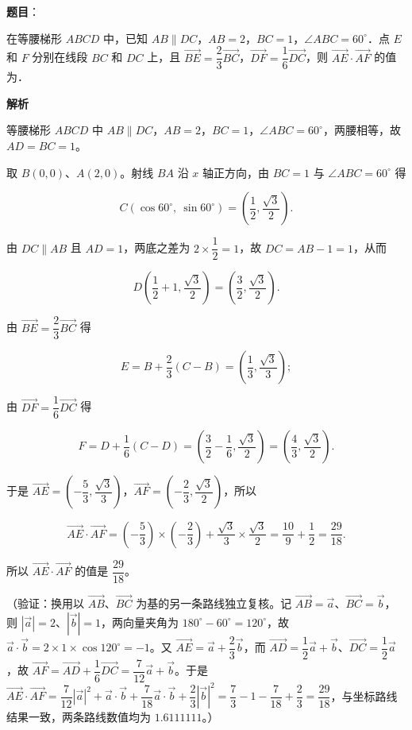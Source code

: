 \begin{answer}

\textbf{题目}：

在等腰梯形 \(ABCD\) 中，已知 \(AB\parallel DC\)，\(AB=2\)，\(BC=1\)，\(\angle ABC=60^{\circ}\)．点 \(E\) 和 \(F\) 分别在线段 \(BC\) 和 \(DC\) 上，且 \(\overrightarrow{BE}=\dfrac{2}{3}\overrightarrow{BC}\)，\(\overrightarrow{DF}=\dfrac{1}{6}\overrightarrow{DC}\)，则 \(\overrightarrow{AE}\cdot\overrightarrow{AF}\) 的值为\gkblank{}．

\textbf{解析}

等腰梯形 \(ABCD\) 中 \(AB\parallel DC\)，\(AB=2\)，\(BC=1\)，\(\angle ABC=60^{\circ}\)，两腰相等，故 \(AD=BC=1\)。

取 \(B(0,0)\)、\(A(2,0)\)。射线 \(BA\) 沿 \(x\) 轴正方向，由 \(BC=1\) 与 \(\angle ABC=60^{\circ}\) 得

\nopagebreak[4]
\[
C\left(\cos60^{\circ},\ \sin60^{\circ}\right)=\left(\dfrac12,\dfrac{\sqrt3}{2}\right).
\]

由 \(DC\parallel AB\) 且 \(AD=1\)，两底之差为 \(2\times\dfrac12=1\)，故 \(DC=AB-1=1\)，从而

\nopagebreak[4]
\[
D\left(\dfrac12+1,\dfrac{\sqrt3}{2}\right)=\left(\dfrac32,\dfrac{\sqrt3}{2}\right).
\]

由 \(\overrightarrow{BE}=\dfrac23\overrightarrow{BC}\) 得

\nopagebreak[4]
\[
E=B+\dfrac23(C-B)=\left(\dfrac13,\dfrac{\sqrt3}{3}\right);
\]

由 \(\overrightarrow{DF}=\dfrac16\overrightarrow{DC}\) 得

\nopagebreak[4]
\[
F=D+\dfrac16(C-D)=\left(\dfrac32-\dfrac16,\dfrac{\sqrt3}{2}\right)=\left(\dfrac43,\dfrac{\sqrt3}{2}\right).
\]

于是 \(\overrightarrow{AE}=\left(-\dfrac53,\dfrac{\sqrt3}{3}\right)\)，\(\overrightarrow{AF}=\left(-\dfrac23,\dfrac{\sqrt3}{2}\right)\)，所以

\nopagebreak[4]
\[
\overrightarrow{AE}\cdot\overrightarrow{AF}=\left(-\dfrac53\right)\times\left(-\dfrac23\right)+\dfrac{\sqrt3}{3}\times\dfrac{\sqrt3}{2}=\dfrac{10}{9}+\dfrac12=\dfrac{29}{18}.
\]

所以 \(\overrightarrow{AE}\cdot\overrightarrow{AF}\) 的值是 \(\dfrac{29}{18}\)。

（验证：换用以 \(\overrightarrow{AB}\)、\(\overrightarrow{BC}\) 为基的另一条路线独立复核。记 \(\overrightarrow{AB}=\vec a\)、\(\overrightarrow{BC}=\vec b\)，则 \(|\vec a|=2\)、\(|\vec b|=1\)，两向量夹角为 \(180^{\circ}-60^{\circ}=120^{\circ}\)，故 \(\vec a\cdot\vec b=2\times1\times\cos120^{\circ}=-1\)。又 \(\overrightarrow{AE}=\vec a+\dfrac23\vec b\)，而 \(\overrightarrow{AD}=\dfrac12\vec a+\vec b\)、\(\overrightarrow{DC}=\dfrac12\vec a\)，故 \(\overrightarrow{AF}=\overrightarrow{AD}+\dfrac16\overrightarrow{DC}=\dfrac7{12}\vec a+\vec b\)。于是 \(\overrightarrow{AE}\cdot\overrightarrow{AF}=\dfrac7{12}|\vec a|^{2}+\vec a\cdot\vec b+\dfrac7{18}\vec a\cdot\vec b+\dfrac23|\vec b|^{2}=\dfrac73-1-\dfrac7{18}+\dfrac23=\dfrac{29}{18}\)，与坐标路线结果一致，两条路线数值均为 \(1.6111111\)。）


\end{answer}
